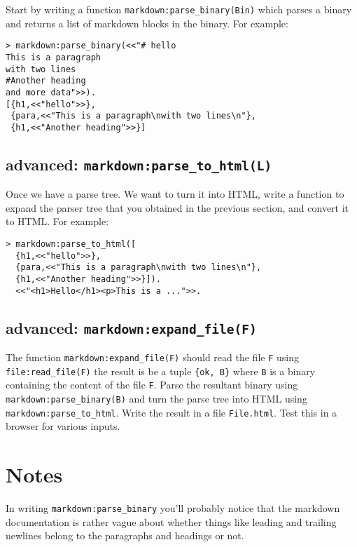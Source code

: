 \documentclass[12pt]{hitec}
\begin{document}
Start by writing a function \verb+markdown:parse_binary(Bin)+ which
parses a binary and returns a list of markdown blocks in the
binary. For example:

\begin{Verbatim}[frame=single]
> markdown:parse_binary(<<"# hello
This is a paragraph
with two lines
#Another heading
and more data">>).
[{h1,<<"hello">>},
 {para,<<"This is a paragraph\nwith two lines\n"},
 {h1,<<"Another heading">>}]
\end{Verbatim}

\subsection{advanced: \texttt{markdown:parse\_to\_html(L)}}

Once we have a parse tree. We want to turn it into HTML, write a
function to expand the parser tree that you obtained in the previous
section, and convert it to HTML. For example:

\begin{Verbatim}[frame=single]
> markdown:parse_to_html([
  {h1,<<"hello">>},
  {para,<<"This is a paragraph\nwith two lines\n"},
  {h1,<<"Another heading">>}]).
  <<"<h1>Hello</h1><p>This is a ...">>.
\end{Verbatim}

\subsection{advanced: \texttt{markdown:expand\_file(F)}}

The function \verb+markdown:expand_file(F)+ should read the file
\verb+F+ using\\
\verb+file:read_file(F)+ the result is be a tuple
\verb+{ok, B}+ where \verb+B+ is a binary containing the content of
the file \verb+F+. Parse the resultant binary using
\verb+markdown:parse_binary(B)+ and turn the parse tree into HTML using
\verb+markdown:parse_to_html+. Write the result in a file
\verb+File.html+. Test this in a browser for various inputs.

\section{Notes}

In writing \verb+markdown:parse_binary+ you'll probably notice that the
markdown documentation is rather vague about whether things like leading
and trailing newlines belong to the paragraphs and headings or not.
\end{document}
